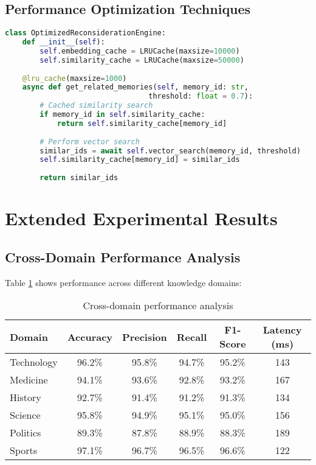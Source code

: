 \documentclass[12pt,a4paper]{article}
\begin{document}
\subsection{Performance Optimization Techniques}

\begin{lstlisting}[language=Python, caption=Caching and Optimization]
class OptimizedReconsiderationEngine:
    def __init__(self):
        self.embedding_cache = LRUCache(maxsize=10000)
        self.similarity_cache = LRUCache(maxsize=50000)
        
    @lru_cache(maxsize=1000)
    async def get_related_memories(self, memory_id: str, 
                                 threshold: float = 0.7):
        # Cached similarity search
        if memory_id in self.similarity_cache:
            return self.similarity_cache[memory_id]
            
        # Perform vector search
        similar_ids = await self.vector_search(memory_id, threshold)
        self.similarity_cache[memory_id] = similar_ids
        
        return similar_ids
\end{lstlisting}

\section{Extended Experimental Results}

\subsection{Cross-Domain Performance Analysis}

Table \ref{tab:cross_domain} shows performance across different knowledge domains:

\begin{table}[h]
\centering
\begin{tabular}{@{}lccccc@{}}
\toprule
\textbf{Domain} & \textbf{Accuracy} & \textbf{Precision} & \textbf{Recall} & \textbf{F1-Score} & \textbf{Latency (ms)} \\
\midrule
Technology & 96.2\% & 95.8\% & 94.7\% & 95.2\% & 143 \\
Medicine & 94.1\% & 93.6\% & 92.8\% & 93.2\% & 167 \\
History & 92.7\% & 91.4\% & 91.2\% & 91.3\% & 134 \\
Science & 95.8\% & 94.9\% & 95.1\% & 95.0\% & 156 \\
Politics & 89.3\% & 87.8\% & 88.9\% & 88.3\% & 189 \\
Sports & 97.1\% & 96.7\% & 96.5\% & 96.6\% & 122 \\
\bottomrule
\end{tabular}
\caption{Cross-domain performance analysis}
\label{tab:cross_domain}
\end{table}
\end{document}
